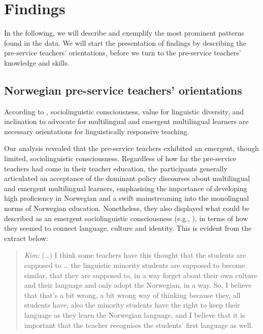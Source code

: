 \documentclass[output=paper]{langscibook}
\begin{document}
\section{Findings}

In the following, we will describe and exemplify the most prominent patterns found in the data. We will start the presentation of findings by describing the pre-service teachers’ orientations, before we turn to the pre-service teachers’ knowledge and skills. 

\subsection{Norwegian pre-service teachers’ orientations}

According to \citet{LucasVillegas2013}, sociolinguistic consciousness, value for linguistic diversity, and inclination to advocate for multilingual and emergent multilingual learners are necessary orientations for linguistically responsive teaching. 

Our analysis revealed that the pre\hyp service teachers exhibited an emergent, though limited, sociolinguistic consciousness. Regardless of how far the pre\hyp service teachers had come in their teacher education, the participants generally articulated an acceptance of the dominant policy discourses about multilingual and emergent multilingual learners, emphasising the importance of developing high proficiency in Norwegian and a swift mainstreaming into the monolingual norms of Norwegian education. Nonetheless, they also displayed what could be described as an emergent sociolinguistic consciousness (e.g., \citealt{LucasVillegas2013}), in terms of how they seemed to connect language, culture and identity. This is evident from the extract below:

\begin{quote}
\emph{Kim:} (…) I think some teachers have this thought that the students are supposed to … the linguistic minority students are supposed to become similar, that they are supposed to, in a way forget about their own culture and their language and only adopt the Norwegian, in a way. So, I believe that that’s a bit wrong, a bit wrong way of thinking because they, all students have, also the minority students have the right to keep their language as they learn the Norwegian language, and I believe that it is important that the teacher recognises the students’ first language as well. 
\end{quote}
\end{document}

